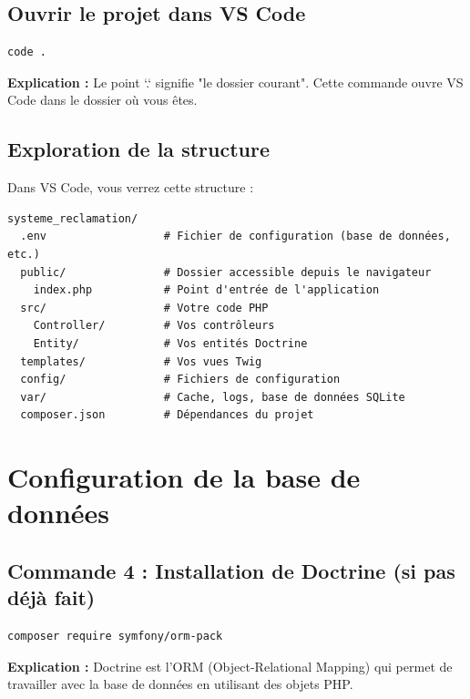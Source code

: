 \documentclass[12pt,a4paper]{article}
\begin{document}
\subsection{Ouvrir le projet dans VS Code}
\begin{lstlisting}[language=bash]
code .
\end{lstlisting}
\textbf{Explication :} Le point `.` signifie "le dossier courant". Cette commande ouvre VS Code dans le dossier où vous êtes.

\subsection{Exploration de la structure}
Dans VS Code, vous verrez cette structure :
\begin{lstlisting}
systeme_reclamation/
  .env                  # Fichier de configuration (base de données, etc.)
  public/               # Dossier accessible depuis le navigateur
    index.php           # Point d'entrée de l'application
  src/                  # Votre code PHP
    Controller/         # Vos contrôleurs
    Entity/             # Vos entités Doctrine
  templates/            # Vos vues Twig
  config/               # Fichiers de configuration
  var/                  # Cache, logs, base de données SQLite
  composer.json         # Dépendances du projet
\end{lstlisting}

\section{Configuration de la base de données}

\subsection{Commande 4 : Installation de Doctrine (si pas déjà fait)}
\begin{lstlisting}[language=bash]
composer require symfony/orm-pack
\end{lstlisting}
\textbf{Explication :} Doctrine est l'ORM (Object-Relational Mapping) qui permet de travailler avec la base de données en utilisant des objets PHP.
\end{document}
